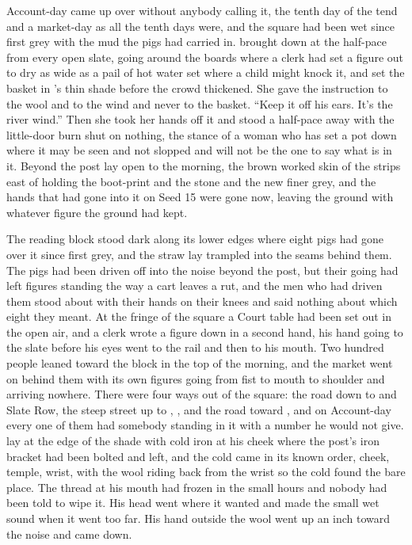 
Account-day came up over  without anybody calling it, the tenth day of the tend and a market-day as all the tenth days were, and the square had been wet since first grey with the mud the pigs had carried in.  brought  down at the half-pace from every open slate, going around the boards where a clerk had set a figure out to dry as wide as a pail of hot water set where a child might knock it, and set the basket in 's thin shade before the crowd thickened. She gave the instruction to the wool and to the wind and never to the basket. “Keep it off his ears. It's the river wind.” Then she took her hands off it and stood a half-pace away with the little-door burn shut on nothing, the stance of a woman who has set a pot down where it may be seen and not slopped and will not be the one to say what is in it. Beyond the post  lay open to the morning, the brown worked skin of the strips east of  holding the boot-print and the stone and the new finer grey, and the hands that had gone into it on Seed 15 were gone now, leaving the ground with whatever figure the ground had kept.

The reading block stood dark along its lower edges where eight pigs had gone over it since first grey, and the straw lay trampled into the seams behind them. The pigs had been driven off into the noise beyond the post, but their going had left figures standing the way a cart leaves a rut, and the men who had driven them stood about with their hands on their knees and said nothing about which eight they meant. At the  fringe of the square a Court table had been set out in the open air, and a clerk wrote a figure down in a second hand, his hand going to the slate before his eyes went to the rail and then to his mouth. Two hundred people leaned toward the block in the top of the morning, and the market went on behind them with its own figures going from fist to mouth to shoulder and arriving nowhere. There were four ways out of the square: the road down to  and Slate Row, the steep street up to , , and the road toward , and on Account-day every one of them had somebody standing in it with a number he would not give.  lay at the edge of the shade with cold iron at his cheek where the post's iron bracket had been bolted and left, and the cold came in its known order, cheek, temple, wrist, with the wool riding back from the wrist so the cold found the bare place. The thread at his mouth had frozen in the small hours and nobody had been told to wipe it. His head went where it wanted and made the small wet sound when it went too far. His hand outside the wool went up an inch toward the noise and came down.

